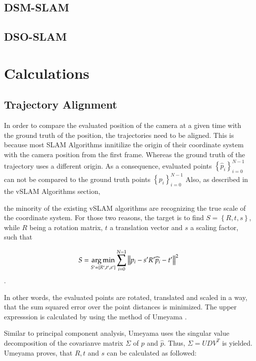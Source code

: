 	

	

	\subsection{DSM-SLAM}

	\subsection{DSO-SLAM}
	

\section{Calculations} \label{calc}

	\subsection{Trajectory Alignment}
	
	In order to compare the evaluated position of the camera at a given time with the ground truth of the 
	position, the trajectories need to be aligned. This is because most SLAM Algorithms innitilize the origin
	of their coordinate system with the camera position from the first frame. Whereas the ground truth of the 
	trajectory uses a different origin. As a consequence, evaluated points $ \left\{{\widehat{p}_i}\right\}_{i=0}^{N-1} $ can not be 
	compared to the ground truth points $ \left\{{p_i}\right\}_{i=0}^{N-1} $
	Also, as described in the vSLAM Algorithms section,
	
	
	the minority of the existing vSLAM algorithms are recognizing the true scale of the coordinate system. For
	those two reasons, the target is to find $S = \left\{R,t,s\right\}$, while $R$ being a rotation matrix, $t$ a translation vector
	and $s$ a scaling factor, 
	such that
	
	$$ S = \mathop{\mathrm{arg\,min}}_{S' = \left\{R', t', s' \right\}} \sum_{i = 0}^{N-1} \left\lVert p_i - s'R'\widehat{p}_i - t'\right\rVert^2 $$ .
	
	In other words, the evaluated points are rotated, translated and scaled in a way, that the sum squared error over the point
	distances is minimized. The upper expresssion is calculated by using the method of Umeyama \cite{ume}. 
	
	Similar to principal component analysis, Umeyama uses the singular value decomposition of the covarianve 
	matrix $\Sigma$ of $p$ and $\widehat{p}$. Thus, 
	$\Sigma = UDV^T$ is yielded. Umeyama proves, that $R,t$ and $s$ can be calculated as followed: 
	
